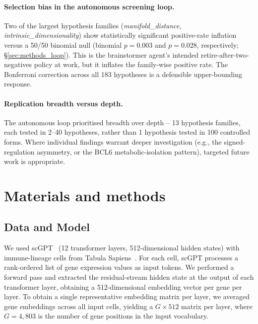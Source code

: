 \documentclass[12pt]{article}
\begin{document}
\paragraph{Selection bias in the autonomous screening loop.}
Two of the largest hypothesis families (\emph{manifold\_distance}, \emph{intrinsic\_dimensionality}) show statistically significant positive-rate inflation versus a 50/50 binomial null (binomial $p = 0.003$ and $p = 0.028$, respectively; §\ref{sec:methods_loop}).
This is the brainstormer agent's intended retire-after-two-negatives policy at work, but it inflates the family-wise positive rate.
The Bonferroni correction across all 183 hypotheses is a defensible upper-bounding response.

\paragraph{Replication breadth versus depth.}
The autonomous loop prioritised breadth over depth -- 13 hypothesis families, each tested in 2--40 hypotheses, rather than 1 hypothesis tested in 100 controlled forms. Where individual findings warrant deeper investigation (e.g., the signed-regulation asymmetry, or the BCL6 metabolic-isolation pattern), targeted future work is appropriate.

\section{Materials and methods}

\subsection{Data and Model}
We used scGPT~\cite{cui2024scgpt} (12 transformer layers, 512-dimensional hidden states) with immune-lineage cells from Tabula Sapiens~\cite{jones2022tabula}.
For each cell, scGPT processes a rank-ordered list of gene expression values as input tokens.
We performed a forward pass and extracted the residual-stream hidden state at the output of each transformer layer, obtaining a 512-dimensional embedding vector per gene per layer.
To obtain a single representative embedding matrix per layer, we averaged gene embeddings across all input cells, yielding a $G \times 512$ matrix per layer, where $G = 4{,}803$ is the number of gene positions in the input vocabulary.
\end{document}
